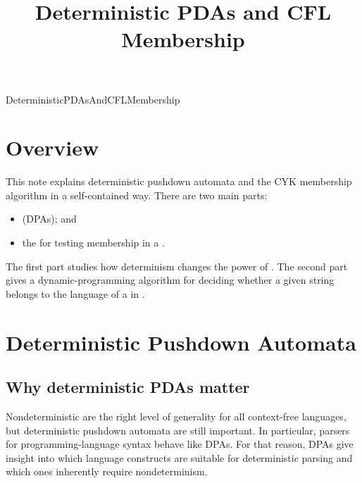 \documentclass[hidelinks]{article}
\title{Deterministic PDAs and CFL Membership}
\author{}
\date{}
\begin{document}
\maketitle

\begin{smodule}[title={Deterministic PDAs and CFL Membership}]{DeterministicPDAsAndCFLMembership}

\section{Overview}

This note explains deterministic pushdown automata and the CYK membership algorithm in a self-contained way.
There are two main parts:
\begin{itemize}
    \item {} (DPAs); and
    \item the  for testing membership in a .
\end{itemize}

The first part studies how determinism changes the power of .
The second part gives a dynamic-programming algorithm for deciding whether a given string belongs to the language of a  in .

\section{Deterministic Pushdown Automata}

\subsection{Why deterministic PDAs matter}

Nondeterministic  are the right level of generality for all context-free languages, but deterministic pushdown automata are still important.
In particular, parsers for programming-language syntax behave like DPAs.
For that reason, DPAs give insight into which language constructs are suitable for deterministic parsing and which ones inherently require nondeterminism.


\end{smodule}
\end{document}
